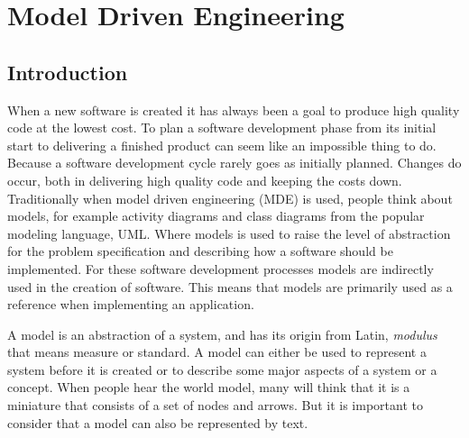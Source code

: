 
\chapter{Model Driven Engineering} %

\label{Chapter2} %



\section{Introduction}

When a new software is created it has always been a goal to produce high
quality code at the lowest cost. To plan a software development phase from its
initial start to delivering a finished product can seem like an impossible
thing to do. Because a software development cycle rarely goes as initially
planned. Changes do occur, both in delivering high quality code and keeping the
costs down. Traditionally when model driven engineering (MDE) is used, people
think about models, for example activity diagrams and class diagrams from the
popular modeling language, UML. Where models is used to raise the level
of abstraction for the problem specification and describing how a software
should be implemented. For these software development processes models are
indirectly used in the creation of software. This means that models are
primarily used as a reference when implementing an application.

A model is an abstraction of a system, and has its origin from Latin,
\textit{modulus} that means measure or standard. A model can either be used to
represent a system before it is created or to describe some major aspects of a
system or a concept. When people hear the world model, many will think that it
is a miniature that consists of a set of nodes and arrows. But it is important
to consider that a model can also be represented by text. 
 
